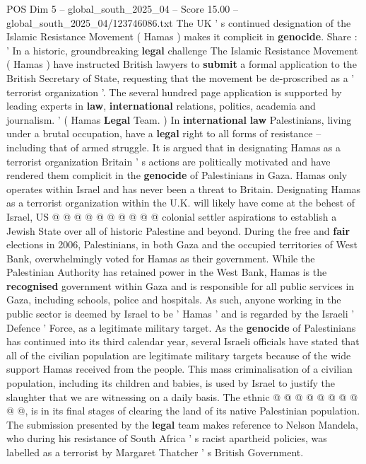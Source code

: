 \begin{textsample}{POS Dim 5 – global\_south\_2025\_04 – Score 15.00 – global\_south\_2025\_04/123746086.txt}  \label{ex:f5_pos_069}
The UK ' s continued designation of the Islamic Resistance Movement ( Hamas ) makes it complicit in \textbf{genocide}.
Share : ' In a historic, groundbreaking \textbf{legal} challenge The Islamic Resistance Movement ( Hamas ) have instructed British lawyers to \textbf{submit} a formal application to the British Secretary of State, requesting that the movement be de-proscribed as a ' terrorist organization '.
The several hundred page application is supported by leading experts in \textbf{law}, \textbf{international} relations, politics, academia and journalism. ' ( Hamas \textbf{Legal} Team. ) In \textbf{international} \textbf{law} Palestinians, living under a brutal occupation, have a \textbf{legal} right to all forms of resistance -- including that of armed struggle.
It is argued that in designating Hamas as a terrorist organization Britain ' s actions are politically motivated and have rendered them complicit in the \textbf{genocide} of Palestinians in Gaza.
Hamas only operates within Israel and has never been a threat to Britain.
Designating Hamas as a terrorist organization within the U.K. will likely have come at the behest of Israel, US @ @ @ @ @ @ @ @ @ @ colonial settler aspirations to establish a Jewish State over all of historic Palestine and beyond.
During the free and \textbf{fair} elections in 2006, Palestinians, in both Gaza and the occupied territories of West Bank, overwhelmingly voted for Hamas as their government.
While the Palestinian Authority has retained power in the West Bank, Hamas is the \textbf{recognised} government within Gaza and is responsible for all public services in Gaza, including schools, police and hospitals.
As such, anyone working in the public sector is deemed by Israel to be ' Hamas ' and is regarded by the Israeli ' Defence ' Force, as a legitimate military target.
As the \textbf{genocide} of Palestinians has continued into its third calendar year, several Israeli officials have stated that all of the civilian population are legitimate military targets because of the wide support Hamas received from the people.
This mass criminalisation of a civilian population, including its children and babies, is used by Israel to justify the slaughter that we are witnessing on a daily basis.
The ethnic @ @ @ @ @ @ @ @ @ @, is in its final stages of clearing the land of its native Palestinian population.
The submission presented by the \textbf{legal} team makes reference to Nelson Mandela, who during his resistance of South Africa ' s racist apartheid policies, was labelled as a terrorist by Margaret Thatcher ' s British Government.

\end{textsample}
